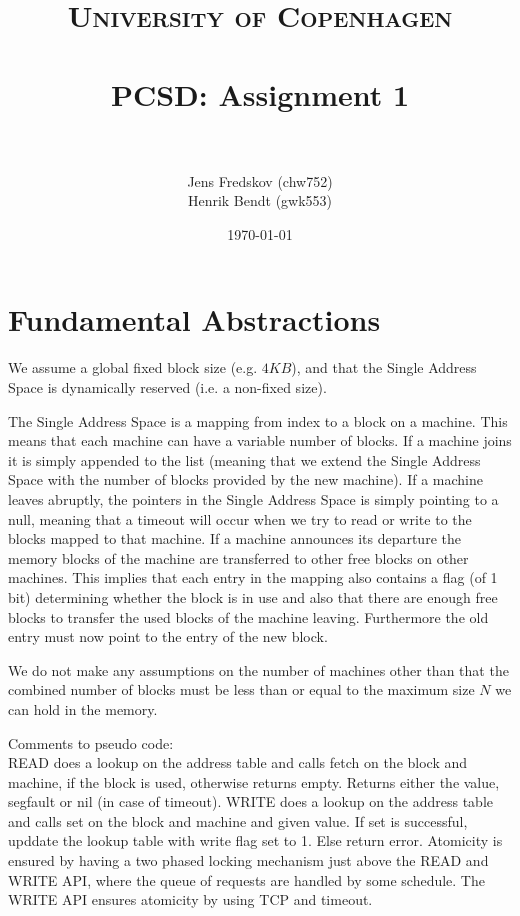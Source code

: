 \documentclass[a4paper, 11pt]{article}
\title{ 
\normalfont \normalsize 
\textsc{University of Copenhagen} \\ [25pt]
\horrule{0.5pt} \\[0.4cm]
\huge PCSD: Assignment 1 \\
\horrule{2pt} \\[0.5cm]
}
\author{Jens Fredskov (chw752)\\Henrik Bendt (gwk553)} %
\date{\normalsize\today} %
\begin{document}
\maketitle

\section{Fundamental Abstractions} %
\label{sec:fundamental_abstractions}

We assume a global fixed block size (e.g. $4KB$), and that the Single Address Space is dynamically reserved (i.e. a non-fixed size).

The Single Address Space is a mapping from index to a block on a machine. This means that each machine can have a variable number of blocks. If a machine joins it is simply appended to the list (meaning that we extend the Single Address Space with the number of blocks provided by the new machine). If a machine leaves abruptly, the pointers in the Single Address Space is simply pointing to a null, meaning that a timeout will occur when we try to read or write to the blocks mapped to that machine. If a machine announces its departure the memory blocks of the machine are transferred to other free blocks on other machines. This implies that each entry in the mapping also contains a flag (of 1 bit) determining whether the block is in use and also that there are enough free blocks to transfer the used blocks of the machine leaving. Furthermore the old entry must now point to the entry of the new block.

We do not make any assumptions on the number of machines other than that the combined number of blocks must be less than or equal to the maximum size $N$ we can hold in the memory.

Comments to pseudo code:\\
READ does a lookup on the address table and calls fetch on the block and machine, if the block is used, otherwise returns empty. Returns either the value, segfault or nil (in case of timeout).
WRITE does a lookup on the address table and calls set on the block and machine and given value. If set is successful, upddate the lookup table with write flag set to 1. Else return error.
Atomicity is ensured by having a two phased locking mechanism just above the READ and WRITE API, where the queue of requests are handled by some schedule. The WRITE API ensures atomicity by using TCP and timeout.


\end{document}
